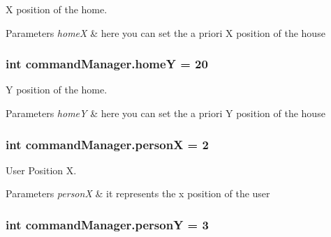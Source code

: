 X position of the home. 


\begin{DoxyParams}{Parameters}
{\em homeX} & here you can set the a priori X position of the house \\
\hline
\end{DoxyParams}
\subsubsection[{\texorpdfstring{homeY}{homeY}}]{\setlength{\rightskip}{0pt plus 5cm}int command\+Manager.\+homeY = 20}\hypertarget{namespacecommandManager_a9deb4aa18f5f193991dbfb07d1f8e0b3}{}\label{namespacecommandManager_a9deb4aa18f5f193991dbfb07d1f8e0b3}


Y position of the home. 


\begin{DoxyParams}{Parameters}
{\em homeY} & here you can set the a priori Y position of the house \\
\hline
\end{DoxyParams}
\subsubsection[{\texorpdfstring{personX}{personX}}]{\setlength{\rightskip}{0pt plus 5cm}int command\+Manager.\+personX = 2}\hypertarget{namespacecommandManager_a6884642ee072d436560aca2420d14d62}{}\label{namespacecommandManager_a6884642ee072d436560aca2420d14d62}


User Position X. 


\begin{DoxyParams}{Parameters}
{\em personX} & it represents the x position of the user \\
\hline
\end{DoxyParams}
\subsubsection[{\texorpdfstring{personY}{personY}}]{\setlength{\rightskip}{0pt plus 5cm}int command\+Manager.\+personY = 3}\hypertarget{namespacecommandManager_a765b4c6755570fef5702e26fede7b8e6}{}\label{namespacecommandManager_a765b4c6755570fef5702e26fede7b8e6}


